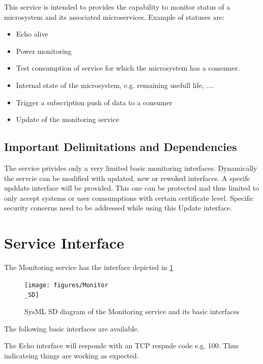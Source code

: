 \documentclass[a4paper]{arrowhead}
\begin{document}
This service is intended to provides the capability to monitor status of a
microsystem and its associated microservices. Example of statuses are:
\begin{itemize}
\item Echo alive
\item Power monitoring
\item Test consumption of service for which the microsystem has a
  consumer.
\item Internal state of the microsystem, e.g. remaining
  usefull life, ....
\item Trigger a subscription push of data to a consumer
\item Update of the monitoring service
\end{itemize}





\subsection{Important Delimitations and Dependencies}
\label{sec:delimitations}

The service privides only a very limited basic monitoring interfaces.
Dynamically the servcie can be modified with updated, new or rewoked interfaces. 
A specifc upddate interface will be provided. This one can be
protected nad thus limited to only accept systems or user comsumptions
with certain certificate level. Specific security concerns need to be
addressed while using this Update interface. 


\section{Service Interface}
\label{sec:operations}


The Monitoring service has the interface depicted in \ref{fig:SD}

\begin{figure}[h!]
  \centering
  \texttt{[image: figures/Monitor\\\_SD]}
  \caption{SysML SD diagram of the Monitoring service and its basic interfaces}
  \label{fig:SD}
\end{figure}

The following basic interfaces are available.



The Echo interface will responde with an TCP respnde code
e.g. 100. Thus indicateing things are working as expected.
\end{document}
